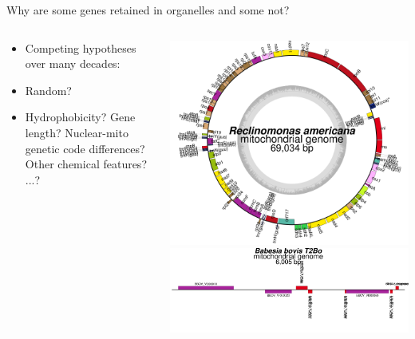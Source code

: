 \documentclass[10pt]{beamer}
\begin{document}
\begin{frame}{Why are some genes retained in organelles and some not?}
  \begin{columns}
    \begin{column}{0.55\textwidth}

      \begin{itemize}
      \item Competing hypotheses over many decades:
      \item Random?
      \item Hydrophobicity? Gene length? Nuclear-mito genetic code differences? Other chemical features? ...?
       \end{itemize}
    \end{column}
    \begin{column}{0.45\textwidth}
      \includegraphics[width=\textwidth]{ogdraw-ra-mt.png} \\
      \hspace{1cm}
      \includegraphics[width=\textwidth]{ogdraw-bb-mt.png} \\
    \end{column}
  \end{columns}

\end{frame}
\end{document}

